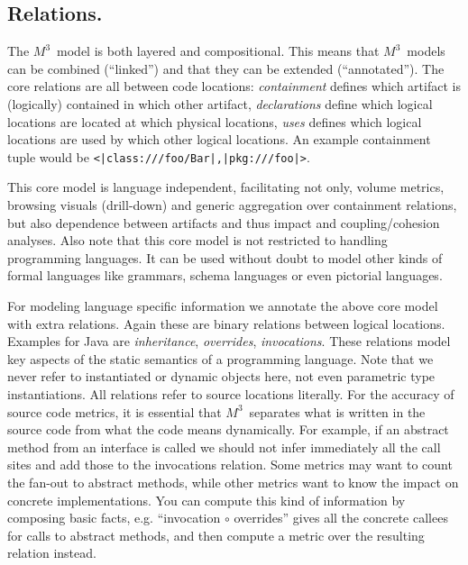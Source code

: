 \documentclass[conference]{IEEEtran}
\newcommand{\loc}[1]{\small{\texttt{#1}}\xspace}
\newcommand{\mthree}{\ensuremath{M^3}\xspace}
\begin{document}
\subsection{Relations.} The \mthree\  model is both layered and compositional.
This means that \mthree\ models can be combined (``linked'') and that they can
be extended (``annotated''). The core relations are all between code
locations: \emph{containment} defines which artifact is (logically) contained
in which other artifact, \emph{declarations} define which logical locations
are located at which physical locations, \emph{uses} defines which logical
locations are used by which other logical locations. An example containment
tuple would be \loc{<|class:///foo/Bar|,|pkg:///foo|>}.

This core model is language independent, facilitating not only, volume
metrics, browsing visuals (drill-down) and generic aggregation over
containment relations, but also dependence between artifacts and thus impact
and coupling/cohesion analyses. Also note that this core model is not
restricted to handling programming languages. It can be used without doubt to
model other kinds of formal languages like grammars, schema languages or even
pictorial languages.

For modeling language specific information we annotate the above core model
with extra relations. Again these are binary relations between logical
locations. Examples for Java are \emph{inheritance}, \emph{overrides},
\emph{invocations}. These relations model key aspects of the static semantics
of a programming language. Note that we never refer to instantiated or dynamic
objects here, not even parametric type instantiations. All relations refer to
source locations literally. For the accuracy of source code metrics, it is
essential that \mthree\  separates what is written in the source code from
what the code means dynamically. For example, if an abstract method from an
interface is called we should not infer immediately all the call sites and add
those to the invocations relation. Some metrics may want to count the fan-out
to abstract methods, while other metrics want to know the impact on concrete
implementations. You can compute this kind of information by composing basic
facts, e.g. ``invocation $\circ$ overrides'' gives all the concrete callees
for calls to abstract methods, and then compute a metric over the resulting
relation instead.
\end{document}

